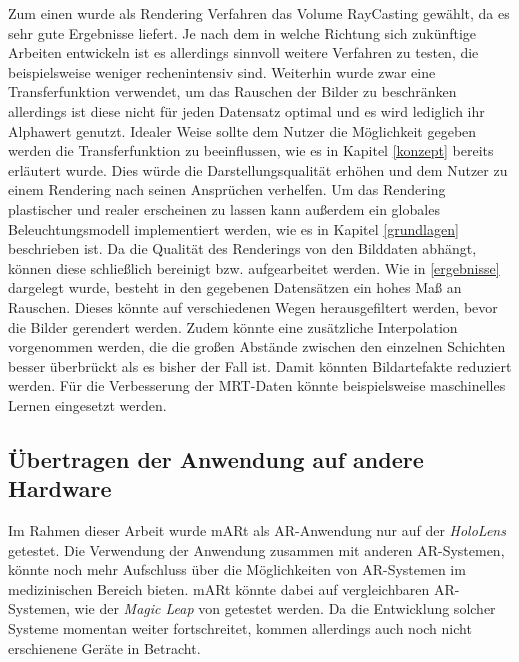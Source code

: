 Zum einen wurde als Rendering Verfahren das Volume RayCasting gewählt, da es sehr gute Ergebnisse liefert. Je nach dem in welche Richtung sich zukünftige Arbeiten entwickeln ist es allerdings sinnvoll weitere Verfahren zu testen, die beispielsweise weniger rechenintensiv sind. 
Weiterhin wurde zwar eine Transferfunktion verwendet, um das Rauschen der Bilder zu beschränken allerdings ist diese nicht für jeden Datensatz optimal und es wird lediglich ihr Alphawert genutzt. 
Idealer Weise sollte dem Nutzer die Möglichkeit gegeben werden die Transferfunktion zu beeinflussen, wie es in Kapitel \ref{konzept} bereits erläutert wurde. Dies würde die Darstellungsqualität erhöhen und dem Nutzer zu einem Rendering nach seinen Ansprüchen verhelfen. 
Um das Rendering plastischer und realer erscheinen zu lassen kann außerdem ein globales Beleuchtungsmodell implementiert werden, wie es in Kapitel \ref{grundlagen} beschrieben ist. 
Da die Qualität des Renderings von den Bilddaten abhängt, können diese schließlich bereinigt bzw. aufgearbeitet werden. Wie in \ref{ergebnisse} dargelegt wurde, besteht in den gegebenen Datensätzen ein hohes Maß an Rauschen. Dieses könnte auf verschiedenen Wegen herausgefiltert werden, bevor die Bilder gerendert werden. Zudem könnte eine zusätzliche Interpolation vorgenommen werden, die die großen Abstände zwischen den einzelnen Schichten besser überbrückt als es bisher der Fall ist. Damit könnten Bildartefakte reduziert werden. 
Für die Verbesserung der MRT-Daten könnte beispielsweise maschinelles Lernen eingesetzt werden.

\subsection{Übertragen der Anwendung auf andere Hardware}
\label{hololens2Fazit}

Im Rahmen dieser Arbeit wurde mARt als AR-Anwendung nur auf der \textit{HoloLens} getestet. 
Die Verwendung der Anwendung zusammen mit anderen AR-Systemen, könnte noch mehr Aufschluss über die Möglichkeiten von AR-Systemen im medizinischen Bereich bieten. 
mARt könnte dabei auf vergleichbaren AR-Systemen, wie der \textit{Magic Leap} von \cite{magicLeap} getestet werden.
Da die Entwicklung solcher Systeme momentan weiter fortschreitet, kommen allerdings auch noch nicht erschienene Geräte in Betracht.

